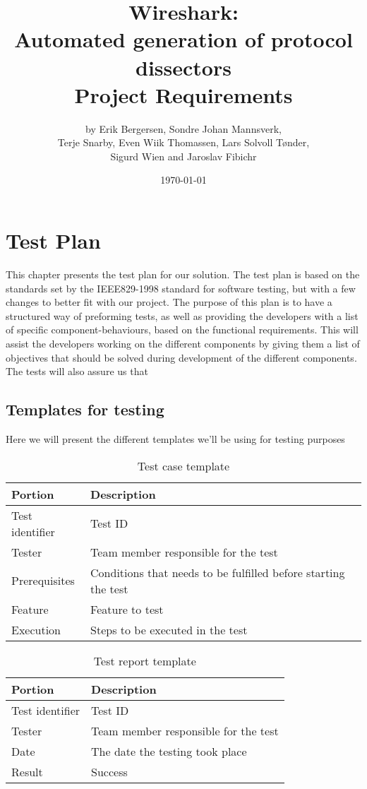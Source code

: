 \documentclass[a4paper, 11pt]{report}
\title{Wireshark:\\ Automated generation of protocol dissectors\\
		Project Requirements}
\author{by Erik Bergersen, Sondre Johan Mannsverk,\\ Terje Snarby,
		Even Wiik Thomassen, Lars Solvoll Tønder,\\ Sigurd Wien
		and Jaroslav Fibichr}
\date{\today}
\begin{document}
\chapter{Test Plan}

This chapter presents the test plan for our solution. The test plan is based on  the standards set by the IEEE829-1998 standard for software testing, but with a few changes to better fit with our project. The purpose of this plan is to have a structured way of preforming tests, as well as providing the developers with a list of specific component-behaviours, based on the functional requirements. This will assist the developers working on the different components by giving them a list of objectives that should be solved during development of the different components. The tests will also assure us that 

\section{Templates for testing}

Here we will present the different templates we'll be using for testing purposes\\

\begin{table}[H]
\begin{tabular}{| l | l |}
Portion & Description\\
\hline\hline
Test identifier & Test ID\\
Tester & Team member responsible for the test\\
Prerequisites & Conditions that needs to be fulfilled before starting the test\\
Feature & Feature to test\\
Execution & Steps to be executed in the test\\
\hline
\end{tabular}
\caption{Test case template}
\end{table}

\begin{table}[H]
\begin{tabular}{| l | l |}
Portion & Description\\
\hline\hline
Test identifier & Test ID\\
Tester & Team member responsible for the test\\
Date & The date the testing took place\\
Result & Success \\
\end{tabular}
\caption{Test report template}
\end{table}
\end{document}

